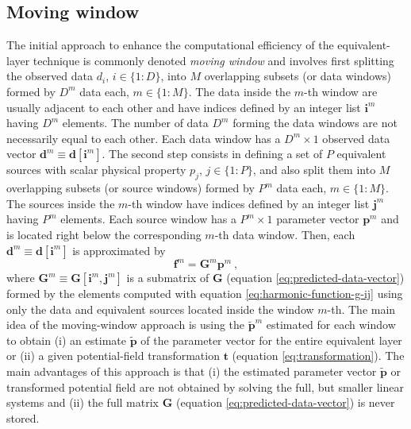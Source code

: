 \documentclass[utf8]{FrontiersinHarvard} %
\begin{document}
	\subsection{Moving window}
	
	The initial approach to enhance the computational efficiency of the equivalent-layer technique 
	is commonly denoted \textit{moving window} and involves
	first splitting the observed data $d_{i}$, $i \in \{1 : D\}$, into $M$ overlapping subsets (or data windows) 
	formed by $D^{m}$ data each, $m \in \{ 1 : M \}$.
	The data inside the $m$-th window are usually adjacent to each other and have indices defined by an 
	integer list $\mathbf{i}^{m}$ having $D^{m}$ elements.
	The number of data $D^{m}$ forming the data windows are not necessarily equal to each other.
	Each data window has a $D^{m} \times 1$ observed data vector $\mathbf{d}^{m} \equiv \mathbf{d}[\mathbf{i}^{m}]$.
	The second step consists in defining a set of $P$ equivalent sources with scalar physical property $p_{j}$, $j \in \{1:P\}$,
	and also split them into $M$ overlapping subsets (or source windows) formed by $P^{m}$ data each, $m \in \{ 1 : M \}$.
	The sources inside the $m$-th window have indices defined by an integer list $\mathbf{j}^{m}$ having $P^{m}$ elements.
	Each source window has a $P^{m} \times 1$ parameter vector $\mathbf{p}^{m}$ and
	is located right below the corresponding $m$-th data window. 
	Then, each $\mathbf{d}^{m} \equiv \mathbf{d}[\mathbf{i}^{m}]$ is approximated by 
	\begin{equation}
		\mathbf{f}^{m} = \mathbf{G}^{m} \mathbf{p}^{m} \: ,
		\label{eq:predicted-data-window-m}
	\end{equation}
	where $\mathbf{G}^{m} \equiv \mathbf{G}[\mathbf{i}^{m}, \mathbf{j}^{m}]$ is a submatrix of 
	$\mathbf{G}$ (equation \ref{eq:predicted-data-vector}) formed by the elements computed with equation 
	\ref{eq:harmonic-function-g-ij} using only the data and equivalent sources located inside the window $m$-th.
	The main idea of the moving-window approach is using the $\tilde{\mathbf{p}}^{m}$ estimated for 
	each window to obtain (i) an estimate $\tilde{\mathbf{p}}$ of the parameter vector for the entire equivalent layer
	or (ii) a given potential-field transformation $\mathbf{t}$ (equation \ref{eq:transformation}).
	The main advantages of this approach is that (i) the estimated parameter vector $\tilde{\mathbf{p}}$ or transformed potential field
	are not obtained by solving the full, but smaller linear systems and (ii) the full matrix $\mathbf{G}$ (equation \ref{eq:predicted-data-vector})
	is never stored.
	
\end{document}
